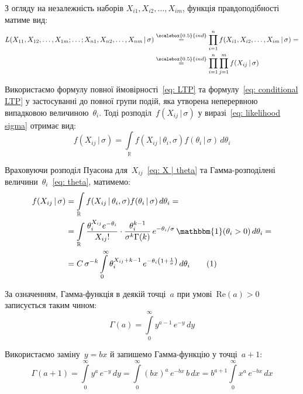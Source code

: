 З огляду на незалежність наборів $X_{i1},X_{i2},\ldots,X_{im}$, функція правдоподібності матиме вид:
\begin{align}\label{eq: likelihood sigma}
    L(X_{11},X_{12},\ldots,X_{1m};\ldots;X_{n1},X_{n2},\ldots,X_{nm} \,|\, \sigma) &\overset{\scalebox{0.5}{ind}}{=} \prod\limits_{i=1}^{n} f(X_{i1},X_{i2},\ldots,X_{im} \,|\, \sigma) = \notag \\
    & \overset{\scalebox{0.5}{ind}}{=} \prod\limits_{i=1}^{n} \prod\limits_{j=1}^{m} f(X_{ij} \,|\, \sigma)
\end{align}

Використаємо формулу повної ймовірності~\eqref{eq: LTP} та формулу~\eqref{eq: conditional LTP} у застосуванні до повної групи подій, яка утворена неперервною випадковою величиною~$\theta_i$. Тоді розподіл~$f(X_{ij} \,|\, \sigma)$ у виразі~\eqref{eq: likelihood sigma} отримає вид:
\begin{equation}\label{eq: theta density}
    f(X_{ij} \,|\, \sigma) = \int\limits_{\mathbb{R}} f(X_{ij} \,|\, \theta_i,\sigma) f(\theta_i \,|\, \sigma)\, d\theta_i
\end{equation}

Враховуючи розподіл Пуасона для~$X_{ij}$~\eqref{eq: X | theta} та Гамма-розподілені величини~$\theta_i$~\eqref{eq: theta}, матимемо:
\begin{align*}\label{eq: edited theta density}
    f(X_{ij} \,|\, \sigma) & = \int\limits_{\mathbb{R}} f(X_{ij} \,|\, \theta_i,\sigma) f(\theta_i \,|\, \sigma)\, d\theta_i = \\
    & = \int\limits_{\mathbb{R}} \frac{\theta_i^{X_{ij}}e^{-\theta_i}}{X_{ij}!} \cdot \frac{\theta_{i}^{k-1}}{\sigma^{k}\Gamma(k)}\, e^{-\theta_i/\sigma}\, \mathbbm{1}(\theta_i>0)\, d\theta_i = \\
    & = C \, \sigma^{-k} \int\limits_{0}^{\infty} \theta_{i}^{X_{ij}+k-1}\, e^{-\theta_{i}\left( 1+\frac{1}{\sigma} \right)} \, d\theta_i \stepcounter{equation}\tag{\theequation}
\end{align*}

За означенням, Гамма-функція в деякій точці~$a$ при умові~$\mathrm{Re}(a)>0$ записується таким чином:
\begin{equation}\label{eq: G(a+1)}
    \Gamma(a) = \int\limits_{0}^{\infty}y^{a-1}\,e^{-y}\,dy
\end{equation}

Використаємо заміну~$y=bx$ й запишемо Гамма-функцію у точці~$a+1:$
\begin{equation}
    \Gamma(a+1) = \int\limits_{0}^{\infty}y^{a}\,e^{-y}\,dy = \int\limits_{0}^{\infty}(bx)^{a}\,e^{-bx}\,b\,dx = b^{a+1}\int\limits_{0}^{\infty}x^{a}\,e^{-bx}\,dx
\end{equation}


